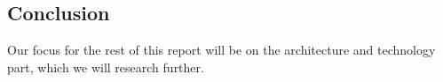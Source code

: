 \subsection{Conclusion}

Our focus for the rest of this report will be on the architecture and technology part, which we will research further.